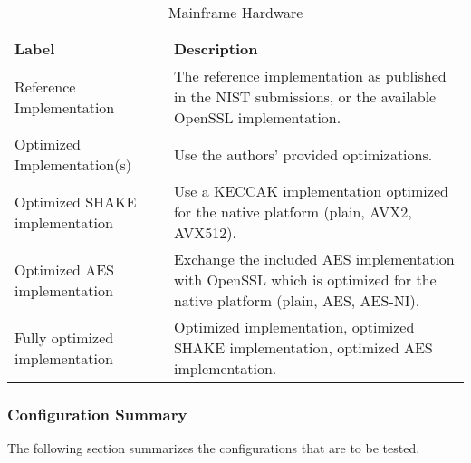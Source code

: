 \begin{table}[H]
    \centering
    \begin{tabular}{l|p{6cm}}
        Label & Description\\
        \hline
        Reference Implementation & The reference implementation as published in the NIST submissions, or the available OpenSSL implementation. \\
        Optimized Implementation(s) & Use the authors' provided optimizations.\\
        Optimized SHAKE implementation & Use a KECCAK implementation optimized for the native platform (plain, AVX2, AVX512).\\
        Optimized AES implementation & Exchange the included AES implementation with OpenSSL which is optimized for the native platform (plain, AES, AES-NI).\\
        Fully optimized implementation & Optimized implementation, optimized SHAKE implementation, optimized AES implementation.\\
    \end{tabular}
    \caption{Mainframe Hardware}
    \label{table:method:mainframe-hardware}
\end{table}

\subsubsection{Configuration Summary}

The following section summarizes the configurations that are to be tested.

